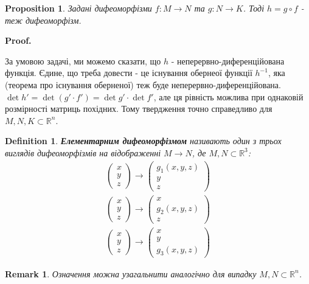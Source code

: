 \documentclass[a4paper, 10pt]{article}
\makeatletter
\def\qed{$\blacksquare$}
\theoremstyle{theoremdd}
\theoremstyle{theoremdd}
\newtheorem{definition}[theorem]{Definition}
\theoremstyle{theoremdd}
\theoremstyle{theoremdd}
\theoremstyle{theoremdd}
\theoremstyle{theoremdd}
\theoremstyle{theoremdd}
\theoremstyle{theoremdd}
\theoremstyle{theoremdd}
\newtheorem{proposition}[theorem]{Proposition}
\theoremstyle{theoremdd}
\theoremstyle{theoremdd}
\newtheorem{remark}[theorem]{Remark}
\theoremstyle{theoremdd}
\theoremstyle{theoremdd}
\theoremstyle{theoremdd}
\theoremstyle{theoremdd}
\renewenvironment{proof}[1][Proof.\\]{\par
\pushQED{\hfill \qed}%
\normalfont \topsep6\p@\@plus6\p@\relax
\trivlist
\item\relax
{\bfseries
#1\@addpunct{.}}\hspace\labelsep\ignorespaces
}{%
\popQED\endtrivlist\@endpefalse
}
\makeatother
\begin{document}
\begin{proposition}
Задані дифеоморфізми $f: M \to N$ та $g: N \to K$. Тоді $h = g \circ f$ - теж дифеоморфізм.
\end{proposition}

\begin{proof}
За умовою задачі, ми можемо сказати, що $h$ - неперервно-диференційована функція. Єдине, що треба довести - це існування обернеої функції $h^{-1}$, яка (теорема про існування оберненої) теж буде неперервно-диференційована.\\
$\det h' = \det (g' \cdot f') = \det g' \cdot \det f'$, але ця рівність можлива при однаковій розмірності матриць похідних. Тому твердження точно справедливо для $M,N,K \subset \mathbb{R}^n$.
\end{proof}

\begin{definition}
\textbf{Елементарним дифеоморфізмом} називають один з трьох виглядів дифеоморфізмів на відображенні $M \to N$, де $M,N \subset \mathbb{R}^3$:
\begin{align*}
\begin{pmatrix}
x \\ y \\ z
\end{pmatrix} \to \begin{pmatrix}
g_1(x,y,z) \\ y \\ z
\end{pmatrix} \\
\begin{pmatrix}
x \\ y \\ z
\end{pmatrix} \to \begin{pmatrix}
x \\ g_2(x,y,z) \\ z
\end{pmatrix} \\
\begin{pmatrix}
x \\ y \\ z
\end{pmatrix} \to \begin{pmatrix}
x \\ y \\ g_3(x,y,z)
\end{pmatrix}
\end{align*}
\end{definition}

\begin{remark}
Означення можна узагальнити аналогічно для випадку $M,N \subset \mathbb{R}^n$.
\end{remark}
\end{document}
